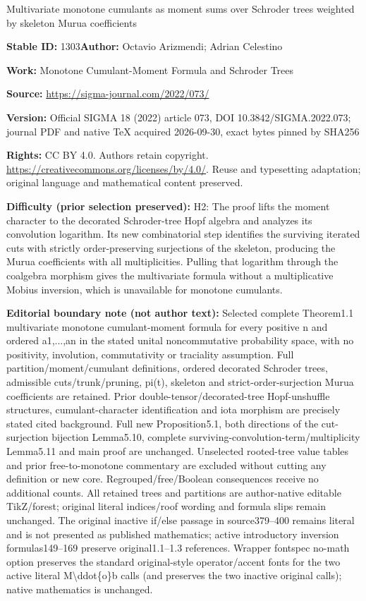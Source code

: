 \documentclass[11pt]{article}
\numberwithin{equation}{section}
\numberwithin{equation}{section}
\begin{document}
\begin{center}\Large Multivariate monotone cumulants as moment sums over Schroder trees weighted by skeleton Murua coefficients\end{center}
\noindent\textbf{Stable ID:} 1303\quad\textbf{Author:} Octavio Arizmendi; Adrian Celestino\par
\noindent\textbf{Work:} Monotone Cumulant-Moment Formula and Schroder Trees\par
\noindent\textbf{Source:} \url{https://sigma-journal.com/2022/073/}\par
\noindent\textbf{Version:} Official SIGMA 18 (2022) article 073, DOI 10.3842/SIGMA.2022.073; journal PDF and native TeX acquired 2026-09-30, exact bytes pinned by SHA256\par
\noindent\textbf{Rights:} CC BY 4.0. Authors retain copyright. \url{https://creativecommons.org/licenses/by/4.0/}. Reuse and typesetting adaptation; original language and mathematical content preserved.\par
\noindent\textbf{Difficulty (prior selection preserved):} {\CJKfont H2: The proof lifts the moment character to the decorated Schroder-tree Hopf algebra and analyzes its convolution logarithm. Its new combinatorial step identifies the surviving iterated cuts with strictly order-preserving surjections of the skeleton, producing the Murua coefficients with all multiplicities. Pulling that logarithm through the coalgebra morphism gives the multivariate formula without a multiplicative Mobius inversion, which is unavailable for monotone cumulants.}\par
\medskip\noindent\textbf{Editorial boundary note (not author text):} Selected complete Theorem1.1 multivariate monotone cumulant-moment formula for every positive n and ordered a1,...,an in the stated unital noncommutative probability space, with no positivity, involution, commutativity or traciality assumption. Full partition/moment/cumulant definitions, ordered decorated Schroder trees, admissible cuts/trunk/pruning, pi(t), skeleton and strict-order-surjection Murua coefficients are retained. Prior double-tensor/decorated-tree Hopf-unshuffle structures, cumulant-character identification and iota morphism are precisely stated cited background. Full new Proposition5.1, both directions of the cut-surjection bijection Lemma5.10, complete surviving-convolution-term/multiplicity Lemma5.11 and main proof are unchanged. Unselected rooted-tree value tables and prior free-to-monotone commentary are excluded without cutting any definition or new core. Regrouped/free/Boolean consequences receive no additional counts. All retained trees and partitions are author-native editable TikZ/forest; original literal indices/roof wording and formula slips remain unchanged. The original inactive if/else passage in source379–400 remains literal and is not presented as published mathematics; active introductory inversion formulas149–169 preserve original1.1–1.3 references. Wrapper fontspec no-math option preserves the standard original-style operator/accent fonts for the two active literal M\textbackslash{}ddot\{o\}b calls (and preserves the two inactive original calls); native mathematics is unchanged.\par
\end{document}
